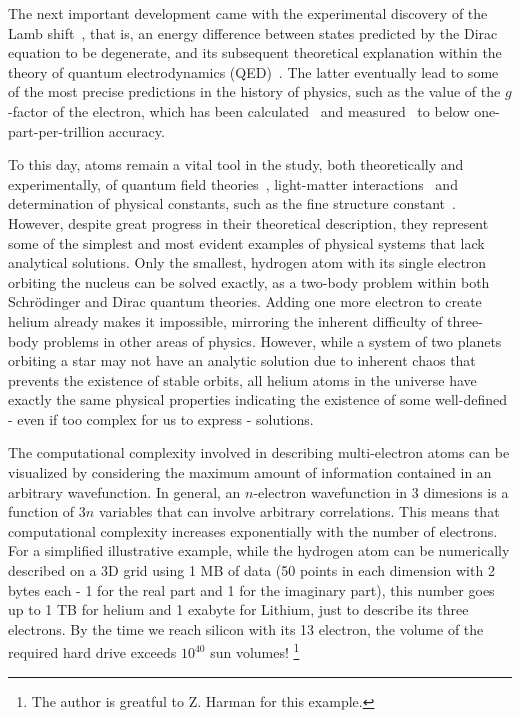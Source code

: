 The next important development came with the experimental discovery of the Lamb shift~\cite{PhysRev.72.241}, that is, an energy difference between states predicted by the Dirac equation to be degenerate, and its subsequent theoretical explanation within the theory of quantum electrodynamics
(QED)~\cite{PhysRev.73.416}. %
The latter eventually lead to some of the most precise predictions in the history of physics, such as the value of the $g$-factor of the electron, which has been calculated~\cite{calculatedgfactor} and measured~\cite{PhysRevLett.97.030801} to below one-part-per-trillion accuracy. 

To this day, atoms remain a vital tool in the study, both theoretically and experimentally, of quantum field theories~\cite{Rafelski2017}, light-matter interactions~\cite{Shafir2009} and determination of physical constants, such as the fine structure constant~\cite{PhysRevLett.97.030802, erratum}. However, despite great progress in their theoretical description, they represent some of the simplest and most evident examples of physical systems that lack analytical solutions. Only the smallest, hydrogen atom with its single electron orbiting the nucleus can be solved exactly, as a two-body problem within both Schr\"{o}dinger and Dirac quantum theories. Adding one more electron to create helium already makes it impossible, mirroring the inherent difficulty of three-body problems in other areas of physics. However, while a system of two planets orbiting a star may not have an analytic solution due to inherent chaos that prevents the existence of stable orbits, all helium atoms in the universe have exactly the same physical properties indicating the existence of some well-defined - even if too complex for us to express - solutions.

 The computational complexity involved in describing multi-electron atoms can be visualized by considering the maximum amount of information contained in an arbitrary wavefunction. In general, an $n$-electron wavefunction in 3 dimesions is a function of $3n$ variables that can involve arbitrary correlations. This means that computational complexity increases exponentially with the number of electrons. For a simplified illustrative example, while the hydrogen atom can be numerically described on a 3D grid using 1 MB of data (50 points in each dimension with 2 bytes each - 1 for the real part and 1 for the imaginary part), this number goes up to 1 TB  for helium and 1 exabyte for Lithium, just to describe its three electrons. By the time we reach silicon with its 13 electron, the volume of the required hard drive exceeds $10^{40}$ sun volumes! \footnote{The author is greatful to Z. Harman for this example.}

